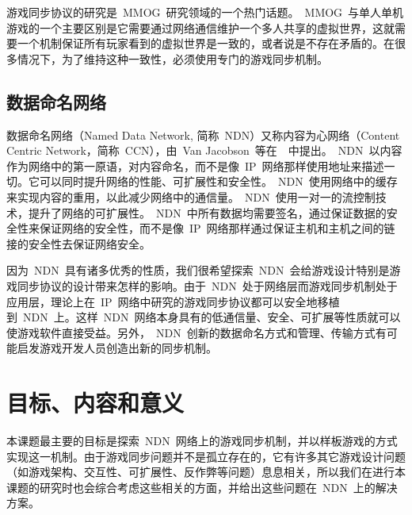 游戏同步协议的研究是~MMOG~研究领域的一个热门话题。~MMOG~与单人单机游戏的一个主要区别是它需要通过网络通信维护一个多人共享的虚拟世界，这就需要一个机制保证所有玩家看到的虚拟世界是一致的，或者说是不存在矛盾的。在很多情况下，为了维持这种一致性，必须使用专门的游戏同步机制。

\subsection{数据命名网络}

数据命名网络（Named Data Network, 简称~NDN）又称内容为心网络（Content Centric Network，简称~CCN），由~Van Jacobson~等在~\cite{Jndn}~中提出。~NDN~以内容作为网络中的第一原语，对内容命名，而不是像~IP~网络那样使用地址来描述一切。它可以同时提升网络的性能、可扩展性和安全性。~NDN~使用网络中的缓存来实现内容的重用，以此减少网络中的通信量。~NDN~使用一对一的流控制技术，提升了网络的可扩展性。~NDN~中所有数据均需要签名，通过保证数据的安全性来保证网络的安全性，而不是像~IP~网络那样通过保证主机和主机之间的链接的安全性去保证网络安全。

因为~NDN~具有诸多优秀的性质，我们很希望探索~NDN~会给游戏设计特别是游戏同步协议的设计带来怎样的影响。由于~NDN~处于网络层而游戏同步机制处于应用层，理论上在~IP~网络中研究的游戏同步协议都可以安全地移植到~NDN~上。这样~NDN~网络本身具有的低通信量、安全、可扩展等性质就可以使游戏软件直接受益。另外，~NDN~创新的数据命名方式和管理、传输方式有可能启发游戏开发人员创造出新的同步机制。

\section{目标、内容和意义}
\label{goals}

本课题最主要的目标是探索~NDN~网络上的游戏同步机制，并以样板游戏的方式实现这一机制。由于游戏同步问题并不是孤立存在的，它有许多其它游戏设计问题（如游戏架构、交互性、可扩展性、反作弊等问题）息息相关，所以我们在进行本课题的研究时也会综合考虑这些相关的方面，并给出这些问题在~NDN~上的解决方案。

